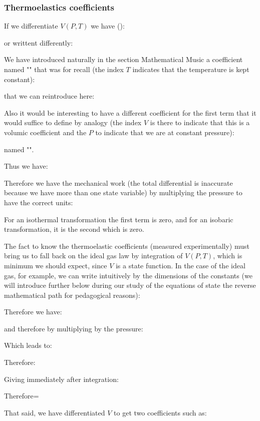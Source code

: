	\subsubsection{Thermoelastics coefficients}
	If we differentiate $V(P, T)$ we have ():
	
	or writtent differently:
	
	We have introduced naturally in the section Mathematical Music a coefficient named "" that was for recall (the index $T$ indicates that the temperature is kept constant):
	
	that we can reintroduce here:
	
	Also it would be interesting to have a different coefficient for the first term that it would suffice to define by analogy (the index $V$ is there to indicate that this is a volumic coefficient and the $P$ to indicate that we are at constant pressure):
	
	named "".

	Thus we have:
	
	Therefore we have the mechanical work (the total differential is inaccurate because we have more than one state variable) by multiplying the pressure to have the correct units:
	
	For an isothermal transformation the first term is zero, and for an isobaric transformation, it is the second which is zero.

	The fact to know the thermoelastic coefficients (measured experimentally) must bring us to fall back on the ideal gas law by integration of $V (P, T)$, which is minimum we should expect, since $V$ is a state function. In the case of the ideal gas, for example, we can write intuitively by the dimensions of the constants (we will introduce further below during our study of the equations of state the reverse mathematical path for pedagogical reasons):
	
	Therefore we have:
	
	and therefore by multiplying by the pressure:
	
	Which leads to:
	
	Therefore:
	
	Giving immediately after integration:
	
	Therefore=
	
	That said, we have differentiated $V$ to get two coefficients such as:
	
